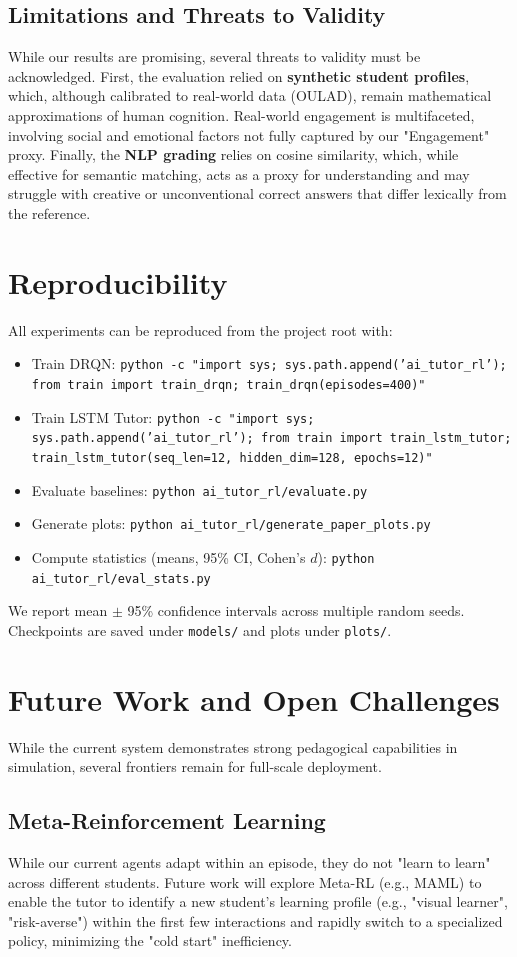 \documentclass[conference]{IEEEtran}
\begin{document}
\subsection{Limitations and Threats to Validity}
While our results are promising, several threats to validity must be acknowledged. First, the evaluation relied on \textbf{synthetic student profiles}, which, although calibrated to real-world data (OULAD), remain mathematical approximations of human cognition. Real-world engagement is multifaceted, involving social and emotional factors not fully captured by our "Engagement" proxy. Finally, the \textbf{NLP grading} relies on cosine similarity, which, while effective for semantic matching, acts as a proxy for understanding and may struggle with creative or unconventional correct answers that differ lexically from the reference.

\section{Reproducibility}
All experiments can be reproduced from the project root with:
\begin{itemize}
\item Train DRQN: \texttt{python -c "import sys; sys.path.append('ai\_tutor\_rl'); from train import train\_drqn; train\_drqn(episodes=400)"}
\item Train LSTM Tutor: \texttt{python -c "import sys; sys.path.append('ai\_tutor\_rl'); from train import train\_lstm\_tutor; train\_lstm\_tutor(seq\_len=12, hidden\_dim=128, epochs=12)"}
\item Evaluate baselines: \texttt{python ai\_tutor\_rl/evaluate.py}
\item Generate plots: \texttt{python ai\_tutor\_rl/generate\_paper\_plots.py}
\item Compute statistics (means, 95\% CI, Cohen's $d$): \texttt{python ai\_tutor\_rl/eval\_stats.py}
\end{itemize}
We report mean $\pm$ 95\% confidence intervals across multiple random seeds. Checkpoints are saved under \texttt{models/} and plots under \texttt{plots/}.

\section{Future Work and Open Challenges}
While the current system demonstrates strong pedagogical capabilities in simulation, several frontiers remain for full-scale deployment.

\subsection{Meta-Reinforcement Learning}
While our current agents adapt within an episode, they do not "learn to learn" across different students. Future work will explore Meta-RL (e.g., MAML) to enable the tutor to identify a new student's learning profile (e.g., "visual learner", "risk-averse") within the first few interactions and rapidly switch to a specialized policy, minimizing the "cold start" inefficiency.
\end{document}
